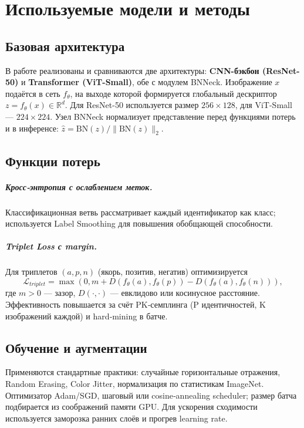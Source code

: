 {\huge\chapter{Используемые модели и методы}}
\label{sec:Chapter2} 

\section{Базовая архитектура}
В работе реализованы и сравниваются две архитектуры: \textbf{CNN-бэкбон (ResNet-50)} и \textbf{Transformer (ViT-Small)}, обе с модулем BNNeck. Изображение \(x\) подаётся в сеть \(f_\theta\), на выходе которой формируется глобальный дескриптор \(z = f_\theta(x)\in\mathbb{R}^d\). Для ResNet-50 используется размер \(256\times128\), для ViT-Small — \(224\times224\). Узел BNNeck нормализует представление перед функциями потерь и в инференсе: \( \hat z = \mathrm{BN}(z) / \lVert \mathrm{BN}(z)\rVert_2 \). %

\section{Функции потерь}
\paragraph{Кросс‑энтропия с ослаблением меток.} Классификационная ветвь рассматривает каждый идентификатор как класс; используется Label Smoothing для повышения обобщающей способности.
\paragraph{Triplet Loss с margin.} Для триплетов \((a,p,n)\) (якорь, позитив, негатив) оптимизируется
\begin{equation}
\mathcal{L}_{triplet} = \max\left(0, m + D(f_\theta(a), f_\theta(p)) - D(f_\theta(a), f_\theta(n))\right),
\end{equation}
где \(m>0\) — зазор, \(D(\cdot,\cdot)\) — евклидово или косинусное расстояние. Эффективность повышается за счёт PK‑семплинга (P идентичностей, K изображений каждой) и hard‑mining в батче.

\section{Обучение и аугментации}
Применяются стандартные практики: случайные горизонтальные отражения, Random Erasing, Color Jitter, нормализация по статистикам ImageNet. Оптимизатор Adam/SGD, шаговый или cosine‑annealing scheduler; размер батча подбирается из соображений памяти GPU. Для ускорения сходимости используется заморозка ранних слоёв и прогрев learning rate.

